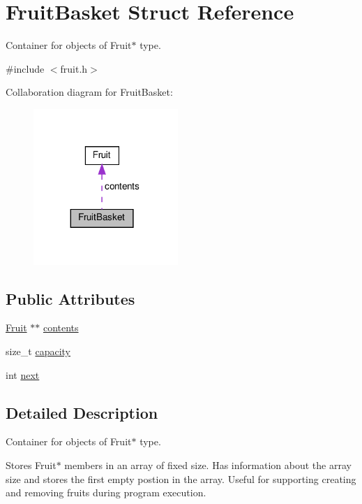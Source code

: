 \hypertarget{structFruitBasket}{}\section{Fruit\+Basket Struct Reference}
\label{structFruitBasket}


Container for objects of Fruit$\ast$ type.  




{\ttfamily \#include $<$fruit.\+h$>$}



Collaboration diagram for Fruit\+Basket\+:\nopagebreak
\begin{figure}[H]
\begin{center}
\leavevmode
\includegraphics[width=155pt]{structFruitBasket__coll__graph}
\end{center}
\end{figure}
\subsection*{Public Attributes}
\begin{DoxyCompactItemize}
\item 
\hyperlink{structFruit}{Fruit} $\ast$$\ast$ \hyperlink{structFruitBasket_ae5641a1a4ed91bdc01b4aaf5b263b2b1}{contents}
\item 
size\+\_\+t \hyperlink{structFruitBasket_abcf02dddf09fc857940ec2ec6a101400}{capacity}
\item 
int \hyperlink{structFruitBasket_a752bfa7c141af1434ddb78ce754e8db6}{next}
\end{DoxyCompactItemize}


\subsection{Detailed Description}
Container for objects of Fruit$\ast$ type. 

Stores Fruit$\ast$ members in an array of fixed size. Has information about the array size and stores the first empty postion in the array. Useful for supporting creating and removing fruits during program execution. 

